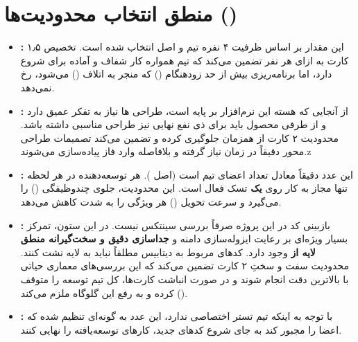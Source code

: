 \section{منطق انتخاب محدودیت‌ها ()}

\begin{itemize}

    \item\textbf{:}
این مقدار بر اساس ظرفیت ۴ نفره تیم و اصل  انتخاب شده است. تخصیص ۱٫۵ کارت به ازای هر نفر تضمین می‌کند که تیم همواره کار شفاف و آماده برای شروع دارد، اما برنامه‌ریزی بیش از حد زودهنگام () که منجر به اتلاف () می‌شود، رخ نمی‌دهد.

    \item\textbf{:}
از آنجایی که هسته این نرم‌افزار بر پایه  است، طراحی ها نیاز به تفکر عمیق دارد و از طرفی محصول باید برای ذی نفع نهایی نیز طراحی مناسبی داشته باشد. محدودیت ۲ کارت از  همزمان جلوگیری کرده و تضمین می‌کند تصمیمات طراحی محور دقیقاً در زمان نیاز گرفته و بلافاصله وارد فاز پیاده‌سازی می‌شوند.z
    \item\textbf{:}
این عدد دقیقاً معادل تعداد اعضای تیم است (اصل ). هر توسعه‌دهنده در هر لحظه تنها مجاز به کار روی \textbf{یک} تسک فعال است. این محدودیت، جلوی چندوظیفگی () را می‌گیرد و سرعت تحویل () هر ویژگی را به شدت کاهش می‌دهد.

    \item\textbf{:}
بازبینی کد در این پروژه صرفاً بررسی سینتکس نیست. در این ستون، تمرکز بسیار ویژه‌ای بر رعایت ایزوله‌سازی دامنه و \textbf{جداسازی دقیق و سخت‌گیرانه منطق لایه  از } وجود دارد. کدهای مربوط به دیتابیس مطلقاً نباید به لایه  نشت کنند. محدودیت سفت و سختِ ۲ کارت تضمین می‌کند که این بررسی‌های معماری حیاتی با بالاترین دقت انجام شوند و در صورت انباشت کارت‌ها، کل تیم توسعه را متوقف کرده و به رفع این گلوگاه ملزم می‌کند ().

    \item\textbf{:}
با توجه به اینکه تیم تستر اختصاصی ندارد، این عدد به گونه‌ای تنظیم شده که اعضا را مجبور کند به جای شروع کدهای جدید، کارهای توسعه‌یافته را نهایی کنند.    
    

\end{itemize}
